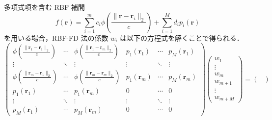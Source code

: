 多項式項を含む RBF 補間
\begin{equation}
    f(\bm{r}) = \sum_{i=1}^m c_i \phi\left(\frac{\|\bm{r} - \bm{r}_i\|_2}{c}\right) + \sum_{i=1}^M d_i p_i(\bm{r})
\end{equation}
を用いる場合，RBF-FD 法の係数 $w_i$ は以下の方程式を解くことで得られる．
\begin{equation}
    \begin{pmatrix}
        \phi\left(\frac{\|\bm{r}_1 - \bm{r}_1\|_2}{c}\right) & \cdots & \phi\left(\frac{\|\bm{r}_1 - \bm{r}_m\|_2}{c}\right) &
        p_1(\bm{r}_1)                                        & \cdots & p_M(\bm{r}_1)                                          \\
        \vdots                                               & \ddots & \vdots                                               &
        \vdots                                               & \ddots & \vdots                                                 \\
        \phi\left(\frac{\|\bm{r}_m - \bm{r}_1\|_2}{c}\right) & \cdots & \phi\left(\frac{\|\bm{r}_m - \bm{r}_m\|_2}{c}\right) &
        p_1(\bm{r}_m)                                        & \cdots & p_M(\bm{r}_m)                                          \\
        p_1(\bm{r}_1)                                        & \cdots & p_1(\bm{r}_m)                                        &
        0                                                    & \cdots & 0                                                      \\
        \vdots                                               & \ddots & \vdots                                               &
        \vdots                                               & \ddots & \vdots                                                 \\
        p_M(\bm{r}_1)                                        & \cdots & p_M(\bm{r}_m)                                        &
        0                                                    & \cdots & 0
    \end{pmatrix}
    \begin{pmatrix}
        w_1 \\ \vdots \\ w_m \\ w_{m+1} \\ \vdots \\ w_{m+M}
    \end{pmatrix}
    =
    \begin{pmatrix}

\end{pmatrix}
\end{equation}
